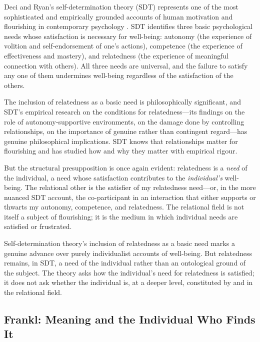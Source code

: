 \noindent
Deci and Ryan's self-determination theory (SDT) represents one of the most sophisticated and empirically grounded accounts of human motivation and flourishing in contemporary psychology \parencite{deci1985}. SDT identifies three basic psychological needs whose satisfaction is necessary for well-being: autonomy (the experience of volition and self-endorsement of one's actions), competence (the experience of effectiveness and mastery), and relatedness (the experience of meaningful connection with others). All three needs are universal, and the failure to satisfy any one of them undermines well-being regardless of the satisfaction of the others.

The inclusion of relatedness as a basic need is philosophically significant, and SDT's empirical research on the conditions for relatedness---its findings on the role of autonomy-supportive environments, on the damage done by controlling relationships, on the importance of genuine rather than contingent regard---has genuine philosophical implications. SDT knows that relationships matter for flourishing and has studied how and why they matter with empirical rigour.

But the structural presupposition is once again evident: relatedness is a \emph{need} of the individual, a need whose satisfaction contributes to the \emph{individual's} well-being. The relational other is the satisfier of my relatedness need---or, in the more nuanced SDT account, the co-participant in an interaction that either supports or thwarts my autonomy, competence, and relatedness. The relational field is not itself a subject of flourishing; it is the medium in which individual needs are satisfied or frustrated.

\begin{claim}
Self-determination theory's inclusion of relatedness as a basic need marks a genuine advance over purely individualist accounts of well-being. But relatedness remains, in SDT, a need of the individual rather than an ontological ground of the subject. The theory asks how the individual's need for relatedness is satisfied; it does not ask whether the individual is, at a deeper level, constituted by and in the relational field.
\end{claim}

\subsection{Frankl: Meaning and the Individual Who Finds It}
\label{p14:subsec:frankl}

